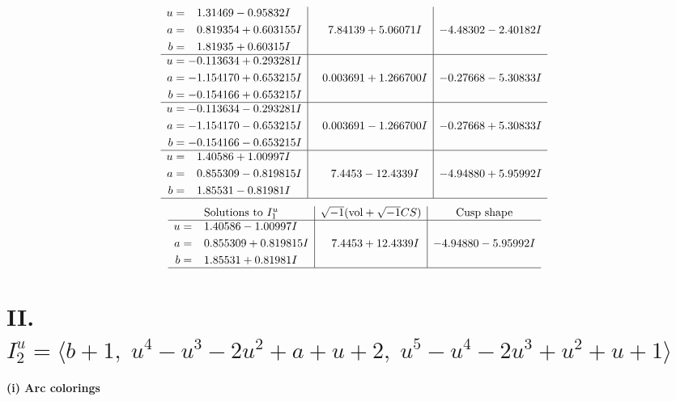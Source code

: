 \documentclass[1p]{elsarticle_modified}
\theoremstyle{definition}
\newcommand{\I}{\sqrt{-1}}
\begin{document}
$$\begin{array}{c|c|c}
\begin{aligned}
u &= \phantom{-}1.31469 - 0.95832 I \\
a &= \phantom{-}0.819354 + 0.603155 I \\
b &= \phantom{-}1.81935 + 0.60315 I\end{aligned}
 & \phantom{-}7.84139 + 5.06071 I & -4.48302 - 2.40182 I \\ \hline\begin{aligned}
u &= -0.113634 + 0.293281 I \\
a &= -1.154170 + 0.653215 I \\
b &= -0.154166 + 0.653215 I\end{aligned}
 & \phantom{-}0.003691 + 1.266700 I & -0.27668 - 5.30833 I \\ \hline\begin{aligned}
u &= -0.113634 - 0.293281 I \\
a &= -1.154170 - 0.653215 I \\
b &= -0.154166 - 0.653215 I\end{aligned}
 & \phantom{-}0.003691 - 1.266700 I & -0.27668 + 5.30833 I \\ \hline\begin{aligned}
u &= \phantom{-}1.40586 + 1.00997 I \\
a &= \phantom{-}0.855309 - 0.819815 I \\
b &= \phantom{-}1.85531 - 0.81981 I\end{aligned}
 & \phantom{-}7.4453 - 12.4339 I & -4.94880 + 5.95992 I\\
 \hline 
 \end{array}$$\newpage$$\begin{array}{c|c|c}  
\text{Solutions to }I^u_{1}& \I (\text{vol} + \sqrt{-1}CS) & \text{Cusp shape}\\
 \hline 
\begin{aligned}
u &= \phantom{-}1.40586 - 1.00997 I \\
a &= \phantom{-}0.855309 + 0.819815 I \\
b &= \phantom{-}1.85531 + 0.81981 I\end{aligned}
 & \phantom{-}7.4453 + 12.4339 I & -4.94880 - 5.95992 I\\
 \hline 
 \end{array}$$\newpage\newpage\renewcommand{\arraystretch}{1}
\centering \section*{II. $I^u_{2}= \langle b+1,\;u^4- u^3-2 u^2+a+u+2,\;u^5- u^4-2 u^3+u^2+u+1 \rangle$}
\flushleft \textbf{(i) Arc colorings}\\
\end{document}
